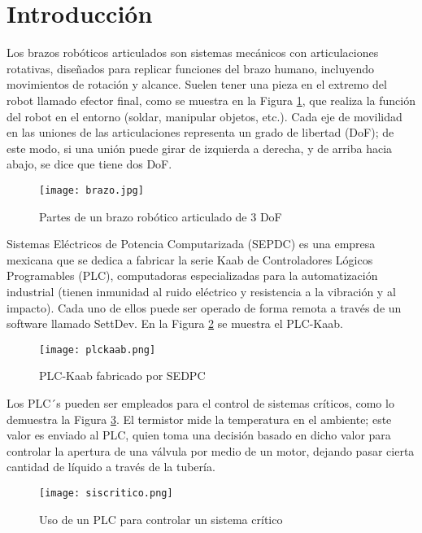 \section{Introducci\'on}

Los brazos robóticos articulados son sistemas mecánicos con articulaciones rotativas, diseñados para replicar funciones del brazo humano, incluyendo movimientos de rotación y alcance. Suelen tener una pieza en el extremo del robot llamado efector final, como se muestra en la Figura \ref{fig:brazoR}, que realiza la función del robot en el entorno (soldar, manipular objetos, etc.). Cada eje de movilidad en las uniones de las articulaciones representa un grado de libertad (DoF); de este modo, si una unión puede girar de izquierda a derecha, y de arriba hacia abajo, se dice que tiene dos DoF.

\vspace{1cm}

\begin{figure}[htb]
	\centering
	\texttt{[image: brazo.jpg]}
	\caption{Partes de un brazo robótico articulado de 3 DoF}
	\label{fig:brazoR}
\end{figure}

\newpage
Sistemas Eléctricos de Potencia Computarizada (SEPDC) es una empresa mexicana que se dedica a fabricar la serie Kaab de Controladores Lógicos Programables (PLC), computadoras especializadas para la automatización industrial (tienen inmunidad al ruido eléctrico y resistencia a la vibración y al impacto). Cada uno de ellos puede ser operado de forma remota a través de un software llamado SettDev. En la Figura \ref{fig:plc} se muestra el PLC-Kaab.

\begin{figure}[htb]
	\centering
	\texttt{[image: plckaab.png]}
	\caption{PLC-Kaab fabricado por SEDPC}
	\label{fig:plc}
\end{figure}

Los PLC´s pueden ser empleados para el control de sistemas críticos, como lo demuestra la Figura \ref{fig:siscritico}. El termistor mide la temperatura en el ambiente; este valor es enviado al PLC, quien toma una decisión basado en dicho valor para controlar la apertura de una válvula por medio de un motor, dejando pasar cierta cantidad de líquido a través de la tubería.

\begin{figure}[htb]
	\centering
	\texttt{[image: siscritico.png]}
	\caption{Uso de un PLC para controlar un sistema crítico}
	\label{fig:siscritico}
\end{figure}